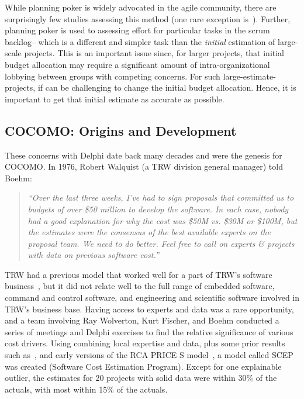 \documentclass{sig-alternate}
\newenvironment{changed}{\par\color{MyDarkBlue}}{\par}
\begin{document}
\begin{changed}
While planning poker is widely advocated in the agile community,
there are surprisingly few studies assessing this method (one rare exception is~\cite{molokk08}).
Further,   planning poker is used to assessing effort
for particular tasks in the scrum backlog-- which is a different and simpler task
than the {\em initial} estimation of  large-scale
projects. This is an important issue since, for larger
projects, that initial budget allocation may require a significant amount of intra-organizational lobbying between groups with competing concerns. For such large-estimate-projects, if can
be challenging to change the initial budget allocation. Hence, it is important to get
that initial estimate as accurate as possible.

\end{changed}
\subsection{COCOMO: Origins and Development}
These concerns with  Delphi  date
back many decades and were the genesis for  COCOMO. In 1976, Robert Walquist (a TRW division general manager)
told  Boehm: \begin{quote}{\em ``Over the last three
weeks, I've had to sign proposals that committed us
to budgets of over \$50 million to develop the
software.  In each case, nobody had a good
explanation for why the cost was \$50M vs. \$30M or
\$100M, but the estimates were the consensus of the
best available experts on the proposal team.  We
need to do better. Feel free to call on experts
\& projects with data on previous software cost.''}\end{quote}



TRW had a previous model that worked well for a part
of TRW's software business~\cite{wol74}, but it
did not relate well to the full range of embedded
software, command and control software, and
engineering and scientific software involved in
TRW's business base.  Having access to experts and
data was a rare opportunity, and a team involving
Ray Wolverton, Kurt Fischer, and Boehm conducted a
series of meetings and Delphi exercises to find
the relative significance of various  cost
drivers. Using combining local expertise  and data, plus some prior results 
such as~\cite{putnam76,black77,herd77,watson77},  and early versions of the RCA
PRICE S model~\cite{frei79}, a model called SCEP was created (Software Cost
Estimation Program).
Except for
one explainable outlier, the estimates for
 20 projects with solid data were within 30\% of
the actuals, with most within 15\% of the actuals.
\end{document}
